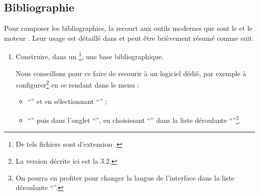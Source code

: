 \subsection{Bibliographie}
\label{sec-bibliographie}

Pour composer les bibliographies, la \gzt{} recourt aux outils modernes que sont
le  et le moteur . Leur usage est détaillé dans
\autocite{Bitouze} et peut être brièvement résumé comme suit.
\begin{enumerate}
\item Construire, dans un \footnote{De tels
    fichiers sont d'extension .}, une base bibliographique.

  Nous conseillons pour ce faire de recourir à un logiciel dédié, par exemple
  \href{http://jabref.sourceforge.net/}{}
  à configurer\footnote{La version décrite ici est la 3.2.} en se rendant
  dans le menu :
  \begin{itemize}
  \item \enquote{} et en sélectionnant \enquote{} ;
  \item \enquote{} puis dans l'onglet \enquote{},
    en choisissant \enquote{} dans la liste déroulante \enquote{}\footnote{On pourra en profiter pour changer la langue de
      l'interface dans la liste déroulante \enquote{}.}.
  \end{itemize}


\end{enumerate}
